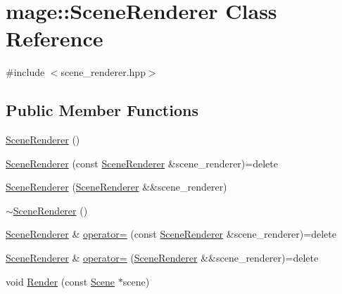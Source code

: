 \hypertarget{classmage_1_1_scene_renderer}{}\section{mage\+:\+:Scene\+Renderer Class Reference}
\label{classmage_1_1_scene_renderer}


{\ttfamily \#include $<$scene\+\_\+renderer.\+hpp$>$}

\subsection*{Public Member Functions}
\begin{DoxyCompactItemize}
\item 
\hyperlink{classmage_1_1_scene_renderer_a5d91f3c9b4e6e7c16d77a6791fadbd64}{Scene\+Renderer} ()
\item 
\hyperlink{classmage_1_1_scene_renderer_a9ea97945a7675ef805f00fb437a3d1aa}{Scene\+Renderer} (const \hyperlink{classmage_1_1_scene_renderer}{Scene\+Renderer} \&scene\+\_\+renderer)=delete
\item 
\hyperlink{classmage_1_1_scene_renderer_ab9846f0a77e2bc5e9eeb00aed67424eb}{Scene\+Renderer} (\hyperlink{classmage_1_1_scene_renderer}{Scene\+Renderer} \&\&scene\+\_\+renderer)
\item 
\hyperlink{classmage_1_1_scene_renderer_a546f45fc7542fa1677d3e9c2014f108e}{$\sim$\+Scene\+Renderer} ()
\item 
\hyperlink{classmage_1_1_scene_renderer}{Scene\+Renderer} \& \hyperlink{classmage_1_1_scene_renderer_a5b63908f5bdfe6128b43847db01db983}{operator=} (const \hyperlink{classmage_1_1_scene_renderer}{Scene\+Renderer} \&scene\+\_\+renderer)=delete
\item 
\hyperlink{classmage_1_1_scene_renderer}{Scene\+Renderer} \& \hyperlink{classmage_1_1_scene_renderer_af64b01e57b0367a285f48e1f34f291e3}{operator=} (\hyperlink{classmage_1_1_scene_renderer}{Scene\+Renderer} \&\&scene\+\_\+renderer)=delete
\item 
void \hyperlink{classmage_1_1_scene_renderer_aa7825b36b1c9e0d22cbd49a9df5e73e4}{Render} (const \hyperlink{classmage_1_1_scene}{Scene} $\ast$scene)
\end{DoxyCompactItemize}
